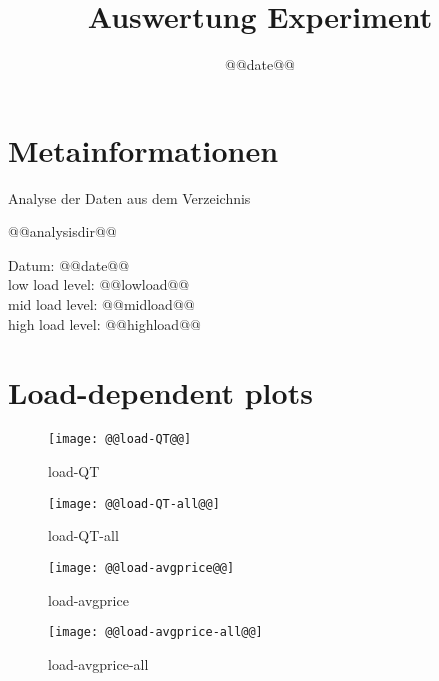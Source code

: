\documentclass[11pt]{article}
\title{\textsf{Auswertung Experiment}}
\date{@@date@@}
\begin{document}
{}

\maketitle

\section{Metainformationen}
Analyse der Daten aus dem Verzeichnis 
\begin{center}
@@analysisdir@@ 
\end{center}
Datum: @@date@@ \\
low load level: @@lowload@@ \\
mid load level: @@midload@@ \\
high load level: @@highload@@ \\

\newpage
\section{Load-dependent plots}

\begin{figure}[htbp]
  \begin{center}
    \texttt{[image: @@load-QT@@]}
    \caption{load-QT}
    \label{fig:load-QT}
  \end{center}
\end{figure}



\begin{figure}[htbp]
  \begin{center}
    \texttt{[image: @@load-QT-all@@]}
    \caption{load-QT-all}
    \label{fig:load-QT-all}
  \end{center}
\end{figure}

\begin{figure}[htbp]
  \begin{center}
    \texttt{[image: @@load-avgprice@@]}
    \caption{load-avgprice}
    \label{fig:load-avgprice}
  \end{center}
\end{figure}


\begin{figure}[htbp]
  \begin{center}
    \texttt{[image: @@load-avgprice-all@@]}
    \caption{load-avgprice-all}
    \label{fig:load-avgprice-all}
  \end{center}
\end{figure}
\end{document}
